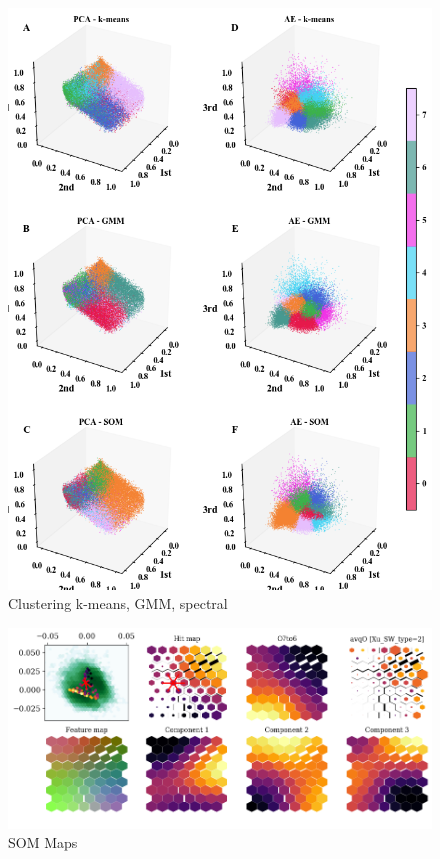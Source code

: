 \documentclass[utf8]{frontiersSCNS} %
\begin{document}
\begin{figure}[h!]
	\begin{center}
		\includegraphics[width=16cm]{Amaya/clustering}%
	\end{center}
	\caption{ Clustering k-means, GMM, spectral}\label{fig:clustering}
\end{figure}

\begin{figure}[h!]
	\begin{center}
		\includegraphics[width=16cm]{maps}%
	\end{center}
	\caption{ SOM Maps}\label{fig:maps}
\end{figure}
\end{document}
